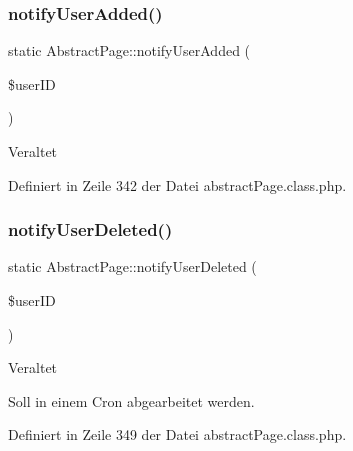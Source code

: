 \subsubsection{\texorpdfstring{notify\+User\+Added()}{notifyUserAdded()}}
{\footnotesize\ttfamily static Abstract\+Page\+::notify\+User\+Added (\begin{DoxyParamCaption}\item[{}]{\$user\+ID }\end{DoxyParamCaption})\hspace{0.3cm}{\ttfamily [static]}}

\begin{DoxyRefDesc}{Veraltet}
\item[\mbox{\hyperlink{deprecated__deprecated000035}{Veraltet}}]\end{DoxyRefDesc}


Definiert in Zeile 342 der Datei abstract\+Page.\+class.\+php.

\mbox{\label{class_abstract_page_ac85ff0f8e7804e01c7af187ed280af8d}} 
\subsubsection{\texorpdfstring{notify\+User\+Deleted()}{notifyUserDeleted()}}
{\footnotesize\ttfamily static Abstract\+Page\+::notify\+User\+Deleted (\begin{DoxyParamCaption}\item[{}]{\$user\+ID }\end{DoxyParamCaption})\hspace{0.3cm}{\ttfamily [static]}}

\begin{DoxyRefDesc}{Veraltet}
\item[\mbox{\hyperlink{deprecated__deprecated000036}{Veraltet}}]Soll in einem Cron abgearbeitet werden. \end{DoxyRefDesc}


Definiert in Zeile 349 der Datei abstract\+Page.\+class.\+php.

\mbox{\label{class_abstract_page_a0702894613df2b99c2016d729db7546e}} 
